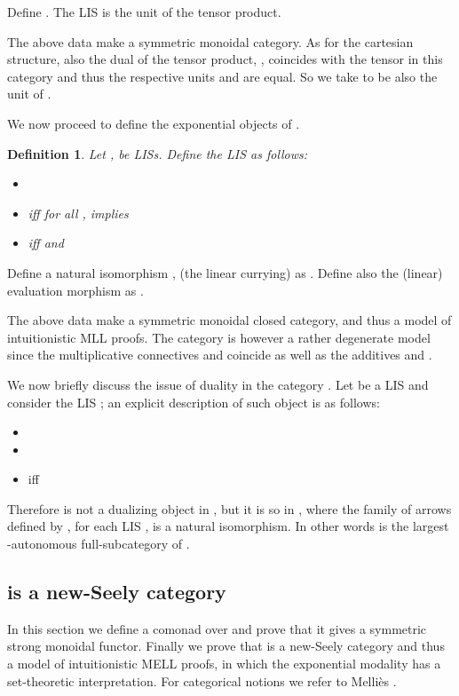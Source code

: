 \documentclass[copyright,creativecommons]{eptcs}
\newtheorem{definition}[theorem]{Definition}
\begin{document}
Define . The LIS  is the unit of the tensor product.

The above data make  a symmetric monoidal category. As for the cartesian structure, also the dual of the tensor product, , coincides with the tensor in this category and thus the respective units  and  are equal. So we take  to be also the unit of .

\medskip

We now proceed to define the exponential objects of .

\begin{definition}
Let ,  be LISs. Define the LIS  as follows:
\begin{itemize}
\item 
\item  iff for all ,  implies 
\item  iff  and 
\end{itemize}
\end{definition}

Define a natural isomorphism , (the linear currying) as . Define also the (linear) evaluation morphism \mbox{} as \mbox{}.

The above data make  a symmetric monoidal closed category, and thus a model of intuitionistic MLL proofs. The category  is however a rather degenerate model since the multiplicative connectives  and  coincide as well as the additives  and .

\medskip

We now briefly discuss the issue of duality in the category . Let  be a LIS and consider the LIS ; an explicit description of such object is as follows: 
\begin{itemize}
\item 
\item 
\item  iff 
\end{itemize}

Therefore  is not a dualizing object in , but it is so in , where the family of arrows  defined by , for each LIS , is a natural isomorphism. In other words  is the largest -autonomous full-subcategory of .

\subsection{ is a new-Seely category}

In this section we define a comonad  over  and prove that it gives a symmetric strong monoidal functor. Finally we prove that  is a new-Seely category and thus a model of intuitionistic MELL proofs, in which the exponential modality  has a set-theoretic interpretation. For categorical notions we refer to Melli\`{e}s \cite{Mellies}.
\end{document}
